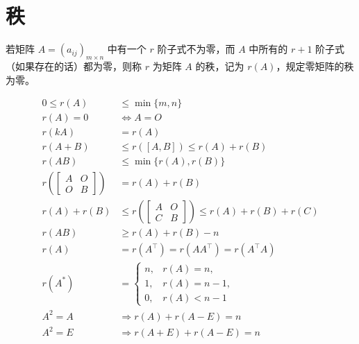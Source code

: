 \documentclass{ctexbook}
\begin{document}
\section{秩}

\begin{definition}[矩阵的秩]
    若矩阵 $A=(a_{ij})_{m\times n}$ 中有一个 $r$ 阶子式不为零，而 $A$ 中所有的 $r+1$ 阶子式（如果存在的话）都为零，则称 $r$ 为矩阵 $A$ 的秩，记为 $r(A)$，规定零矩阵的秩为零。
\end{definition}


\begin{proposition}[矩阵的秩公式]
    \begin{align}
        0\leq r(A)&\leq \min\{m,n\}\\
        r(A)=0&\Leftrightarrow A=O\\
        r(kA)&=r(A)\\
        r(A+B)&\leq r([A,B])\leq r(A)+r(B)\\
        r(AB)&\leq \min\{r(A),r(B)\}\\
        r\left(\left[\begin{matrix}A & O\\O & B\end{matrix}\right]\right)&=r(A)+r(B)\\
        r(A)+r(B)&\leq r\left(\begin{bmatrix}
            A & O \\ C & B
        \end{bmatrix}\right)\leq r(A)+r(B)+r(C)\\
        r(AB)&\geq r(A)+r(B)-n\\
        r(A)&=r(A^\top)=r(AA^\top)=r(A^\top A)\\
        r(A^*)&=\begin{cases}
            n, &r(A)=n,\\
            1, &r(A)=n-1,\\
            0, &r(A)<n-1
        \end{cases}\\
        A^2=A&\Rightarrow r(A)+r(A-E)=n\\
        A^2=E&\Rightarrow r(A+E)+r(A-E)=n
    \end{align}
\end{proposition}
\end{document}

